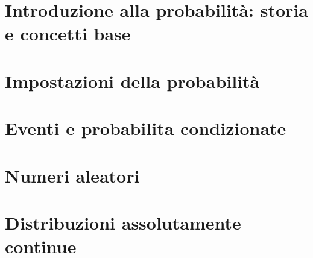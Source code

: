 \documentclass{article}
\begin{document}


\tableofcontents
\restoregeometry

\section{Introduzione alla probabilità: storia e concetti base}


\section{Impostazioni della probabilità}


\section{Eventi e probabilita condizionate}


\section{Numeri aleatori}


\section{Distribuzioni assolutamente continue}

\end{document}
